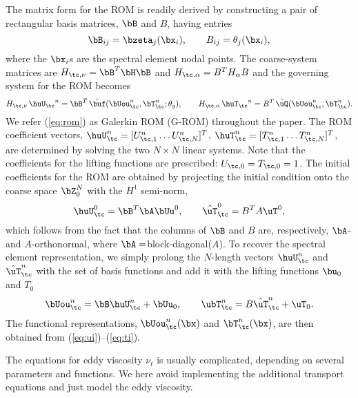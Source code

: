 The matrix form for the ROM is readily derived by constructing a
pair of rectangular basis matrices, $\bB$ and $B$, having entries
%
\begin{equation}
   \bB_{ij} = \bzeta_j(\bx_i), \qquad B_{ij} = \theta_j(\bx_i),\label{eq:bb}
\end{equation}
%
where the $\bx_i$s are the spectral element nodal points.  The coarse-system
matrices are $H_{\tc,\nu} = \bB^T \bH \bB$ and $H_{\tc,\alpha} = B^T H_{\alpha}
B$ and the governing system for the ROM becomes
%
\begin{equation} \label{eq:rom}
   H_{\tc,\nu}  \,{\huU_\tc}^n  = \bB^T \, {\hat \buf}(\bUou_\tc^n,\bT_\tc^n;
   \theta_g), \qquad
   H_{\tc,\alpha}\,{\huT_\tc}^n  =  B^T \, {\hat \uQ}(\bUou_\tc^n,\bT_\tc^n).
\end{equation} 
%
We refer (\ref{eq:rom}) as Galerkin ROM (G-ROM) throughout the paper.  The ROM
coefficient vectors, ${\huU}^n_\tc = [U^n_{\tc,1} \dots U^n_{\tc,N}]^T$,
${\huT}^n_\tc = [T^n_{\tc,1} \dots T^n_{\tc,N}]^T$, are determined by solving
the two $N \times N$ linear systems.  Note that the coefficients for the
lifting functions are prescribed: $U_{\tc,0}=T_{\tc,0}=1$.  The initial
coefficients for the ROM are obtained by projecting the initial condition
onto the coarse space $\bZ_0^N$ with the $H^1$ semi-norm, 
%
\begin{equation} \label{eq:romu_intial}
    \huU^0_\tc = \bB^T \bA \bUu^0, \qquad {\hat \uT}^0_\tc = B^T A \uT^0,
\end{equation} 
%
which follows from the fact that the columns of $\bB$ and $B$ are,
respectively, $\bA$- and $A$-orthonormal, where $\bA=$block-diagonal($A$).
To recover the spectral element representation, we simply
prolong the $N$-length vectors $\huU^n_\tc$ and ${\hat \uT}^n_\tc$ with the
set of basis functions and add it with the lifting functions $\bu_0$ and $T_0$
%
\begin{equation} \label{eq:bv}
   \bUou^n_\tc = \bB \huU^n_\tc + \bUu_0, \qquad \ubT^n_\tc =  B {\hat
   \uT}^n_\tc + \uT_0.
\end{equation}
%
The functional representations, $\bUou_\tc^n(\bx)$ and $\bT_\tc^n(\bx)$, are
then obtained from (\ref{eq:ui})--(\ref{eq:ti}).  

The equations for eddy viscosity $\nu_t$ is usually complicated, depending on
several parameters and functions. We here avoid implementing the additional
transport equations and just model the eddy viscosity.

